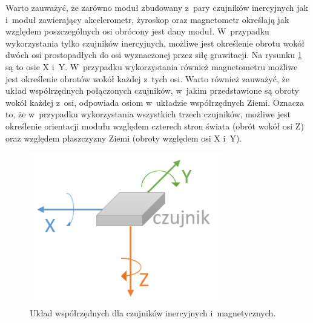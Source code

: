 Warto zauważyć, że zarówno moduł zbudowany z~pary czujników inercyjnych jak i~moduł zawierający akcelerometr, żyroskop oraz magnetometr określają jak względem poszczególnych osi obrócony jest dany moduł. W~przypadku wykorzystania tylko czujników inercyjnych, możliwe jest określenie obrotu wokół dwóch osi prostopadłych do osi wyznaczonej przez siłę grawitacji. Na rysunku \ref{fig:literature:imu:coordination} są to osie X i~Y. W~przypadku wykorzystania również magnetometru możliwe jest określenie obrotów wokół każdej z~tych osi. Warto również zauważyć, że układ współrzędnych połączonych czujników, w~jakim przedstawione są obroty wokół każdej z~osi, odpowiada osiom w~układzie współrzędnych Ziemi. Oznacza to, że w~przypadku wykorzystania wszystkich trzech czujników, możliwe jest określenie orientacji modułu względem czterech stron świata (obrót wokół osi Z) oraz względem płaszczyzny Ziemi (obroty względem osi X i~Y).

\begin{figure}[!htp]
	\centering	
	\includegraphics[width=0.75\textwidth]{images/IMUAxes.png}
	\caption{Układ współrzędnych dla czujników inercyjnych i~magnetycznych.}
	\label{fig:literature:imu:coordination}
\end{figure}

